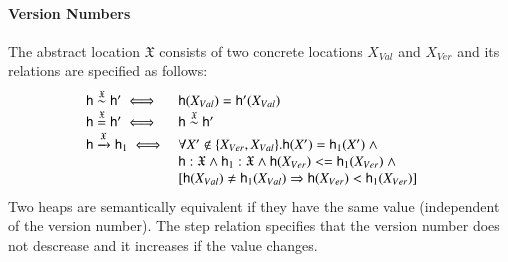 \documentclass[nocopyrightspace,preprint]{sigplanconf}
\newcommand{\cloc}{\ensuremath{X}\xspace}
\newcommand\heap{\ensuremath{\mathsf{h}}\xspace}
\newcommand\h{\heap}
\newcommand\inR[2]{\ensuremath{#1:#2}}
\newcommand\rloc[3]{\ensuremath{#1 \stackrel{#3}{\sim} #2}}
\newcommand\rrloc[3]{\ensuremath{#1 \stackrel{#3}{=} #2}}
\newcommand\gloc[3]{\ensuremath{#1 \xrightarrow{#3}#2}}
\begin{document}
\paragraph{Version Numbers} 
The abstract location $\mathfrak{X}$ consists of two concrete locations $X_{Val}$ and $X_{Ver}$ and its relations are specified as follows:
\[
\hspace{-4mm}
 \begin{array}{ll}
 \rloc{\h}{\h'}{\mathfrak{X}}
  \iff &   \h(\cloc_{Val}) = \h'(\cloc_{Val})\\
\rrloc{\h}{\h'}{\mathfrak{X}} \iff&  \rloc{\h}{\h'}{\mathfrak{X}}\\
    \gloc{\h}{\h_1}{\mathfrak{X}} \iff& \forall \cloc' \notin \{\cloc_{Ver},\cloc_{Val}\}. \h(\cloc') = \h_1(\cloc') ~ \land~\\
    & \inR{\h}{\mathfrak{X}} \land \inR{\h_1}{\mathfrak{X}} \land \h(X_{Ver}) <= \h_1(X_{Ver})~  \land~ \\
    &[\h(X_{Val}) \neq \h_1(X_{Val}) \Rightarrow \h(X_{Ver}) < \h_1(X_{Ver})]
 \end{array}
\]
Two heaps are semantically equivalent if they have the same value (independent of the version number). The step relation specifies that the version number does not descrease and it increases if the value changes.
\end{document}
